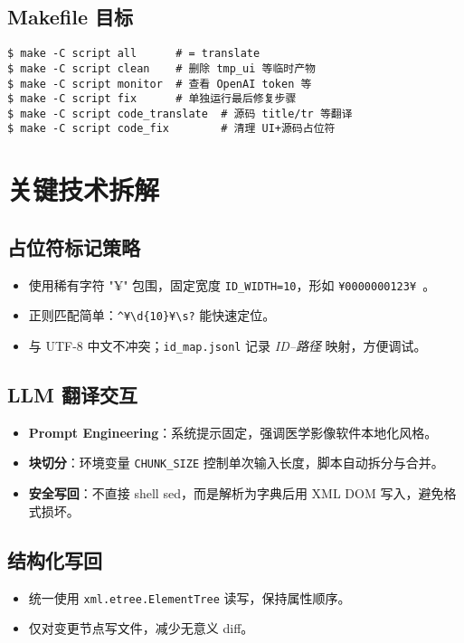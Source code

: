 \documentclass[12pt]{article}
\begin{document}
\subsection*{Makefile 目标}
\begin{lstlisting}
$ make -C script all      # = translate
$ make -C script clean    # 删除 tmp_ui 等临时产物
$ make -C script monitor  # 查看 OpenAI token 等
$ make -C script fix      # 单独运行最后修复步骤
$ make -C script code_translate  # 源码 title/tr 等翻译
$ make -C script code_fix        # 清理 UI+源码占位符
\end{lstlisting}

\section{关键技术拆解}

\subsection{占位符标记策略}
\begin{itemize}
  \item 使用稀有字符 "¥" 包围，固定宽度 \verb|ID_WIDTH=10|，形如 \verb|¥0000000123¥ |。
  \item 正则匹配简单：\verb|^¥\d{10}¥\s?| 能快速定位。
  \item 与 UTF-8 中文不冲突；\texttt{id\_map.jsonl} 记录 \textit{ID--路径} 映射，方便调试。
\end{itemize}

\subsection{LLM 翻译交互}
\begin{itemize}
  \item \textbf{Prompt Engineering}：系统提示固定，强调医学影像软件本地化风格。
  \item \textbf{块切分}：环境变量 \texttt{CHUNK\_SIZE} 控制单次输入长度，脚本自动拆分与合并。
  \item \textbf{安全写回}：不直接 shell sed，而是解析为字典后用 XML DOM 写入，避免格式损坏。
\end{itemize}

\subsection{结构化写回}
\begin{itemize}
  \item 统一使用 \texttt{xml.etree.ElementTree} 读写，保持属性顺序。
  \item 仅对变更节点写文件，减少无意义 diff。
\end{itemize}
\end{document}
